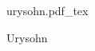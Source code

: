 \documentclass[12pt,a4paper]{article}
\newcommand{\incfig}[1]{%
    \def\svgwidth{\columnwidth}
    {#1.pdf_tex}
}
\begin{document}
\begin{figure}[ht]
    \centering
    \incfig{urysohn}
    \caption{Urysohn}
    \label{fig:urysohn}
\end{figure}
\end{document}
